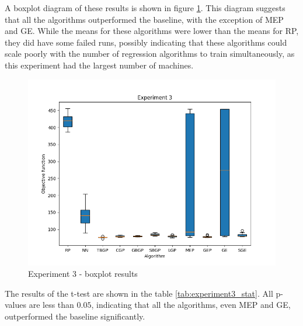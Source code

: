 A boxplot diagram of these results is shown in figure \ref{fig:experiment3}. This diagram suggests that all the algorithms outperformed the baseline, with the exception of MEP and GE. While the means for these algorithms were lower than the means for RP, they did have some failed runs, possibly indicating that these algorithms could scale poorly with the number of regression algorithms to train simultaneously, as this experiment had the largest number of machines.

\begin{figure}[!htbp]
	\centering
	\includegraphics[scale=0.7]{../images/experiment3.png}
	\caption{Experiment 3 - boxplot results}
    \label{fig:experiment3}
\end{figure}

The results of the t-test are shown in the table \ref{tab:experiment3_stat}. All p-values are less than $0.05$, indicating that all the algorithms, even MEP and GE, outperformed the baseline significantly.

